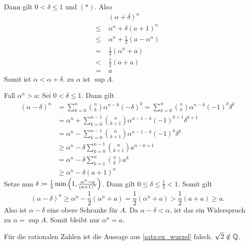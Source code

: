 \documentclass[../ana1.tex]{subfiles}
\begin{document}
\begin{bew}
\begin{faelle}
			Dann gilt \(0<\delta\leq 1\) und \((*) \). Also
			\begin{align*}
				&{(\alpha + \delta)}^n \\
				\leq \; &\alpha^n + \delta {(a+1)}^n \\
				\leq \; &\alpha^n + \frac{1}{2} (a-\alpha^n) \\
				= \; &\frac{1}{2} (\alpha^n+a) \\
				< \; &\frac{1}{2} (a+a) \\
				= \; &a
			\end{align*}
			Somit ist \(\alpha < \alpha + \delta \). \Lightning{} zu \(\alpha \) ist \(\sup A\). \\
		\item[Fall \(\alpha^n > a\):] Sei \(0 < \delta \leq 1 \). Dann gilt
			\!\begin{align*}
				{(\alpha - \delta)}^n & = \sum_{k=0}^{n} \binom{n}{k} \alpha^{n-k} {(-\delta)}^k = \sum_{k=0}^{n} \binom{n}{k} \alpha^{n-k} {(-1)}^k\delta^k \\
								      & = \alpha^n + \sum_{k=0}^{n-1} \binom{n}{k+1} \alpha^{n-1-k} {(-1)}^{k+1}\delta^{k+1} \\
								   	  & = \alpha^n - \sum_{k=0}^{n-1} \binom{n}{k+1} \alpha^{n-1-k} {(-1)}^{k} \delta^k \\
									  & \geq \alpha^n - \delta \sum_{k=0}^{n-1} \binom{n}{k+1} a^{n-k+1} \\
									  & = \alpha^n - \delta \sum_{k=1}^{n} \binom{n}{k} a^k \\
					 				  & \geq \alpha^n - \delta {(a+1)}^n \tag{\(**\)}
			\end{align*}
			Setze nun \( \delta \coloneqq \frac{1}{2} \min \left(1 , \frac{\alpha^n-a}{{(a+1)}^n} \right) \). Dann gilt \(0 \leq \delta \leq \frac{1}{2} < 1 \). Somit gilt
			\[{(\alpha -\delta)}^n \geq \alpha^n - \frac{1}{2} (\alpha^n + a) = \frac{1}{2} (\alpha^n + a) > \frac{1}{2} (a + a) \geq a. \]
			Also ist \( \alpha - \delta \) eine obere Schranke für \(A \). Da \(\alpha - \delta < \alpha \), ist das ein Widerspruch zu \(\alpha = \sup A\). Somit bleibt nur \(\alpha^n = a\).
	\end{faelle}
\end{bew}

\begin{bem}
	Für die rationalen Zahlen ist die Aussage aus \autoref{satz:ex_wurzel} falsch. \zB{} \(\sqrt{2} \notin \mathbb{Q} \).
\end{bem}
\end{document}
